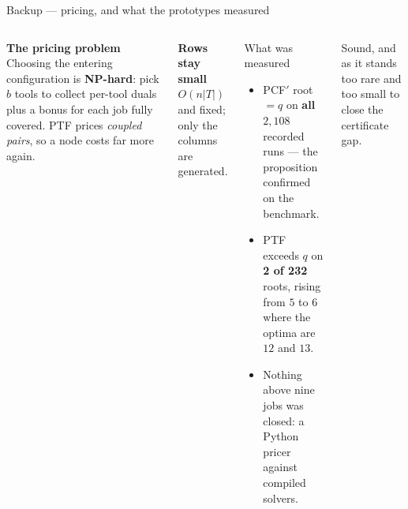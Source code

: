 \documentclass[aspectratio=169,10pt]{beamer}
\begin{document}
\begin{frame}{Backup --- pricing, and what the prototypes measured}
\vspace{0.24cm}
\begin{columns}[T,onlytextwidth]
\textbf{The pricing problem}\\[.25cm]
{\small Choosing the entering configuration is \textbf{NP-hard}: pick $b$ tools to
collect per-tool duals plus a bonus for each job fully covered. PTF prices
\emph{coupled pairs}, so a node costs far more again.}
\vspace{0.24cm}

\textbf{Rows stay small}\\[.25cm]
{\small $O(n\lvert T\rvert)$ and fixed; only the columns are generated.}

\begin{block}{What was measured}
\begin{itemize}\itemsep2pt\small
  \item PCF$'$ root $=q$ on \textbf{all $2{,}108$} recorded runs --- the proposition
  confirmed on the benchmark.
  \item PTF exceeds $q$ on \textbf{2 of 232} roots, rising from $5$ to $6$ where the
  optima are $12$ and $13$.
  \item Nothing above nine jobs was closed: a Python pricer against compiled solvers.
\end{itemize}
\end{block}
\vspace{0.15cm}
{\small Sound, and as it stands too rare and too small to close the certificate gap.}
\end{columns}
\end{frame}
\end{document}
